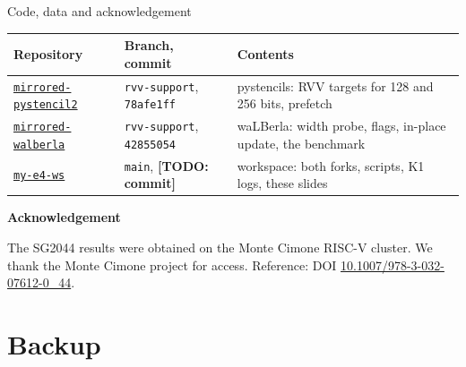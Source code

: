 \documentclass[aspectratio=169,10pt,t]{beamer}
\newcommand{\code}[1]{\texttt{#1}}
\newif\ifshowtodos \showtodostrue
\newcommand{\todo}[1]{\ifshowtodos{\scriptsize\textcolor{psred}{\textbf{[TODO: #1]}}}\fi}
\begin{document}
\begin{frame}{Code, data and acknowledgement}
  \vspace{1mm}
  \small
  \begin{tabularx}{\textwidth}{@{}l l X@{}}
    \toprule
    Repository & Branch, commit & Contents\\
    \midrule
    \href{https://github.com/salehjg/mirrored-pystencil2/tree/rvv-support}{\code{mirrored-pystencil2}}
      & \code{rvv-support}, \code{78afe1ff} & pystencils: RVV targets for 128 and 256 bits, prefetch\\
    \href{https://github.com/salehjg/mirrored-walberla/tree/rvv-support}{\code{mirrored-walberla}}
      & \code{rvv-support}, \code{42855054} & waLBerla: width probe, flags, in-place update, the benchmark\\
    \href{https://github.com/salehjg/my-e4-ws}{\code{my-e4-ws}} & \code{main}, \todo{commit}
      & workspace: both forks, scripts, K1 logs, these slides\\
    \bottomrule
  \end{tabularx}

  \vspace{4mm}
  {\small\bfseries Acknowledgement\par}
  {\footnotesize The SG2044 results were obtained on the Monte Cimone RISC-V cluster. We thank the Monte Cimone
  project for access. Reference: DOI \href{https://doi.org/10.1007/978-3-032-07612-0_44}{10.1007/978-3-032-07612-0\_44}.\par}
  \vfill
  \vspace{2mm}
\end{frame}

\appendix
\section{Backup}
\end{document}
